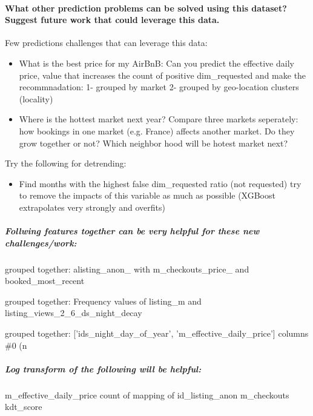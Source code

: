 \documentclass[11pt]{article}
\providecommand{\tightlist}{%
      \setlength{\itemsep}{0pt}\setlength{\parskip}{0pt}}
\begin{document}
    \paragraph{What other prediction problems can be solved using this
dataset? Suggest future work that could leverage this
data.}\label{what-other-prediction-problems-can-be-solved-using-this-dataset-suggest-future-work-that-could-leverage-this-data.}

Few predictions challenges that can leverage this data:

\begin{itemize}
\item
  What is the best price for my AirBnB: Can you predict the effective
  daily price, value that increases the count of positive dim\_requested
  and make the recommnadation: 1- grouped by market 2- grouped by
  geo-location clusters (locality)
\item
  Where is the hottest market next year? Compare three markets
  seperately: how bookings in one market (e.g. France) affects another
  market. Do they grow together or not? Which neighbor hood will be
  hotest market next?
\end{itemize}

Try the following for detrending:

\begin{itemize}
\tightlist
\item
  Find months with the highest false dim\_requested ratio (not
  requested) try to remove the impacts of this variable as much as
  possible (XGBoost extrapolates very strongly and overfits)
\end{itemize}

\subparagraph{Follwing features together can be very helpful for these
new
challenges/work:}\label{follwing-features-together-can-be-very-helpful-for-these-new-challengeswork}

grouped together: alisting\_anon\_ with m\_checkouts\_price\_ and
booked\_most\_recent

grouped together: Frequency values of listing\_m and
listing\_views\_2\_6\_ds\_night\_decay

grouped together: {[}'ids\_night\_day\_of\_year',
'm\_effective\_daily\_price'{]} columns \#0 (n

\subparagraph{Log transform of the following will be
helpful:}\label{log-transform-of-the-following-will-be-helpful}

m\_effective\_daily\_price count of mapping of id\_listing\_anon
m\_checkouts kdt\_score
\end{document}
